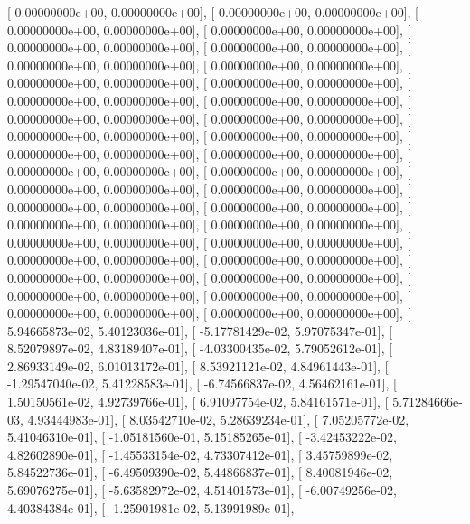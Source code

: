 \documentclass{article}
\begin{document}
       [  0.00000000e+00,   0.00000000e+00],
       [  0.00000000e+00,   0.00000000e+00],
       [  0.00000000e+00,   0.00000000e+00],
       [  0.00000000e+00,   0.00000000e+00],
       [  0.00000000e+00,   0.00000000e+00],
       [  0.00000000e+00,   0.00000000e+00],
       [  0.00000000e+00,   0.00000000e+00],
       [  0.00000000e+00,   0.00000000e+00],
       [  0.00000000e+00,   0.00000000e+00],
       [  0.00000000e+00,   0.00000000e+00],
       [  0.00000000e+00,   0.00000000e+00],
       [  0.00000000e+00,   0.00000000e+00],
       [  0.00000000e+00,   0.00000000e+00],
       [  0.00000000e+00,   0.00000000e+00],
       [  0.00000000e+00,   0.00000000e+00],
       [  0.00000000e+00,   0.00000000e+00],
       [  0.00000000e+00,   0.00000000e+00],
       [  0.00000000e+00,   0.00000000e+00],
       [  0.00000000e+00,   0.00000000e+00],
       [  0.00000000e+00,   0.00000000e+00],
       [  0.00000000e+00,   0.00000000e+00],
       [  0.00000000e+00,   0.00000000e+00],
       [  0.00000000e+00,   0.00000000e+00],
       [  0.00000000e+00,   0.00000000e+00],
       [  0.00000000e+00,   0.00000000e+00],
       [  0.00000000e+00,   0.00000000e+00],
       [  0.00000000e+00,   0.00000000e+00],
       [  0.00000000e+00,   0.00000000e+00],
       [  0.00000000e+00,   0.00000000e+00],
       [  0.00000000e+00,   0.00000000e+00],
       [  0.00000000e+00,   0.00000000e+00],
       [  0.00000000e+00,   0.00000000e+00],
       [  0.00000000e+00,   0.00000000e+00],
       [  0.00000000e+00,   0.00000000e+00],
       [  0.00000000e+00,   0.00000000e+00],
       [  0.00000000e+00,   0.00000000e+00],
       [  5.94665873e-02,   5.40123036e-01],
       [ -5.17781429e-02,   5.97075347e-01],
       [  8.52079897e-02,   4.83189407e-01],
       [ -4.03300435e-02,   5.79052612e-01],
       [  2.86933149e-02,   6.01013172e-01],
       [  8.53921121e-02,   4.84961443e-01],
       [ -1.29547040e-02,   5.41228583e-01],
       [ -6.74566837e-02,   4.56462161e-01],
       [  1.50150561e-02,   4.92739766e-01],
       [  6.91097754e-02,   5.84161571e-01],
       [  5.71284666e-03,   4.93444983e-01],
       [  8.03542710e-02,   5.28639234e-01],
       [  7.05205772e-02,   5.41046310e-01],
       [ -1.05181560e-01,   5.15185265e-01],
       [ -3.42453222e-02,   4.82602890e-01],
       [ -1.45533154e-02,   4.73307412e-01],
       [  3.45759899e-02,   5.84522736e-01],
       [ -6.49509390e-02,   5.44866837e-01],
       [  8.40081946e-02,   5.69076275e-01],
       [ -5.63582972e-02,   4.51401573e-01],
       [ -6.00749256e-02,   4.40384384e-01],
       [ -1.25901981e-02,   5.13991989e-01],
\end{document}
